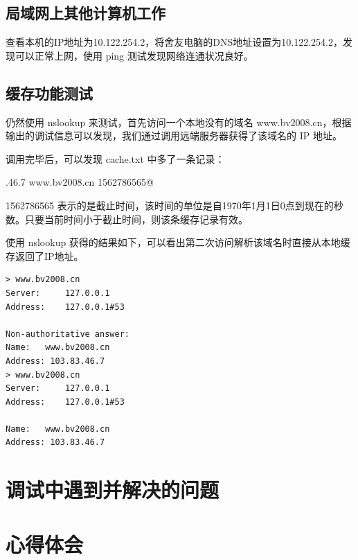 \documentclass[]{article}
\begin{document}
    \subsection{局域网上其他计算机工作}
        查看本机的IP地址为10.122.254.2，将舍友电脑的DNS地址设置为10.122.254.2，发现可以正常上网，使用 ping 测试发现网络连通状况良好。

    \subsection{缓存功能测试}
        仍然使用 nslookup 来测试，首先访问一个本地没有的域名 www.bv2008.cn，根据输出的调试信息可以发现，我们通过调用远端服务器获得了该域名的 IP 地址。

        调用完毕后，可以发现 cache.txt 中多了一条记录：
        
        .46.7 www.bv2008.cn 1562786565@

        1562786565 表示的是截止时间，该时间的单位是自1970年1月1日0点到现在的秒数。只要当前时间小于截止时间，则该条缓存记录有效。

        使用 nslookup 获得的结果如下，可以看出第二次访问解析该域名时直接从本地缓存返回了IP地址。

        \begin{lstlisting}
> www.bv2008.cn
Server:		127.0.0.1
Address:	127.0.0.1#53

Non-authoritative answer:
Name:	www.bv2008.cn
Address: 103.83.46.7
> www.bv2008.cn
Server:		127.0.0.1
Address:	127.0.0.1#53

Name:	www.bv2008.cn
Address: 103.83.46.7
        \end{lstlisting}

\section{调试中遇到并解决的问题}
\section{心得体会}
\end{document}
